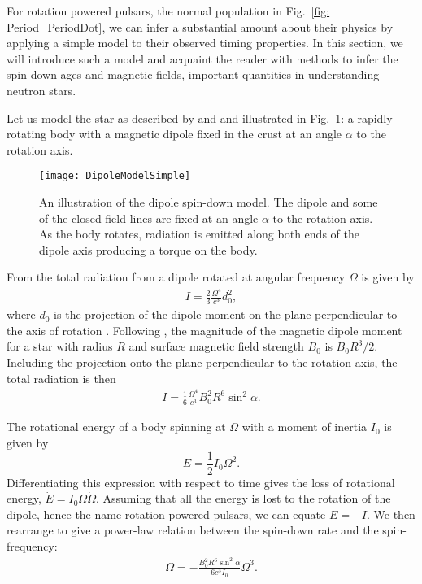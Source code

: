 For rotation powered pulsars, the normal population in Fig.~\ref{fig:
Period_PeriodDot}, we can infer a substantial amount about their physics by
applying a simple model to their observed timing properties. In this section,
we will introduce such a model and acquaint the reader with methods to infer
the spin-down ages and magnetic fields, important quantities in understanding
neutron stars.

Let us model the
star as described by \citet{Pacini1967} and \citet{Gold1968} and illustrated in
Fig.~\ref{fig: DipoleSpindownSimple}: a rapidly rotating
body with a magnetic dipole fixed in the crust at an angle $\alpha$ to the rotation
axis.
\begin{figure}[htb]
    \centering
    \texttt{[image: DipoleModelSimple]}
    \caption{An illustration of the dipole spin-down model. The dipole and some 
    of the closed field lines are fixed at an angle $\alpha$ to the rotation 
    axis. As the body rotates, radiation is emitted along both ends of the dipole
    axis producing a torque on the body.}
    \label{fig: DipoleSpindownSimple}
\end{figure}

From \citet{Landau2013classical} the total radiation from a dipole rotated at
angular frequency $\Omega$ is given by
\begin{align}
I = \frac{2}{3}\frac{\Omega^{4}}{c^{3}} d_{0}^{2},
\end{align}
where $d_0$ is the projection of the dipole moment on the plane perpendicular
to the axis of rotation \citep{Pacini1967}. Following \citet{Shapiro83}, the
magnitude of the magnetic dipole moment for a star with radius $R$ and surface magnetic
field strength $B_0$ is $B_{0}R^{3}/2$. Including the projection onto the
plane perpendicular to the rotation axis, the total radiation is then
\begin{align}
I = \frac{1}{6}\frac{\Omega^{4}}{c^{3}} B_0^2 R^{6} \sin^{2}\alpha.
\end{align}

The rotational energy of a body spinning at $\Omega$ with a moment of inertia
$I_{0}$ is given by
\begin{equation}
    E = \frac{1}{2}I_{0}\Omega^{2}.
\end{equation}
Differentiating this expression with respect to time gives the loss of rotational
energy, $\dot{E}=I_0 \Omega\dot{\Omega}$. Assuming that all the energy is lost
to the rotation of the dipole, hence the name rotation powered pulsars, we can
equate $\dot{E} = -I$. We then rearrange
to give a power-law relation between the spin-down rate and the spin-frequency:
\begin{align}
\dot{\Omega} = -\frac{B_0^{2} R^{6} \sin^{2}\alpha}{6 c^{3} I_0} \Omega^{3}.
\label{eqn: n3 braking}
\end{align}

